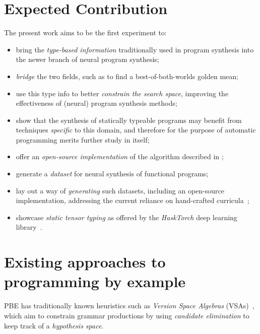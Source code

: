 \documentclass{article}
\begin{document}

\section{Expected Contribution} %

The present work aims to be the first experiment to:
\begin{itemize}
    \item bring the \emph{type-based information} traditionally used in program synthesis into the newer branch of neural program synthesis;
    \item \emph{bridge} the two fields, such as to find a best-of-both-worlds golden mean;
    \item use this type info to better \emph{constrain the search space}, improving the effectiveness of (neural) program synthesis methods;
    \item show that the synthesis of statically typeable programs may benefit from techniques \emph{specific} to this domain, and therefore for the purpose of automatic programming merits further study in itself;
    \item offer an \emph{open-source implementation} of the algorithm described in \citet{nsps};
    \item generate a \emph{dataset} for neural synthesis of functional programs;
    \item lay out a way of \emph{generating} such datasets, including an open-source implementation, addressing the current reliance on hand-crafted curricula~\citep{nps};
    \item showcase \emph{static tensor typing} as offered by the \emph{HaskTorch} deep learning library~\citep{hasktorch}.
\end{itemize}


\section{Existing approaches to programming by example}

PBE has traditionally known heuristics such as
\emph{Version Space Algebras} (VSAs)~\citep{mitchell1982generalization},
which aim to constrain grammar productions by using
\emph{candidate elimination} to keep track of a \emph{hypothesis space}.
\end{document}
